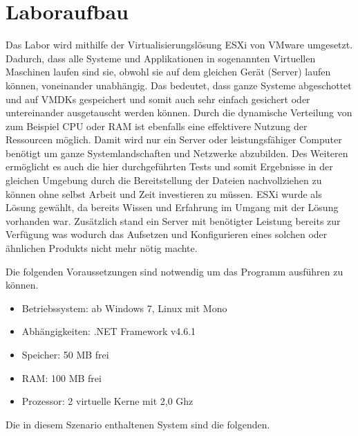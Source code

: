 \section{Laboraufbau}
    Das Labor wird mithilfe der Virtualisierungslösung ESXi %
    von VMware umgesetzt. Dadurch, dass alle Systeme und Applikationen in sogenannten Virtuellen Maschinen laufen sind sie, obwohl sie auf dem gleichen Gerät (Server) laufen können, voneinander unabhängig. Das bedeutet, dass ganze Systeme abgeschottet und auf \ac{VMDK}s gespeichert und somit auch sehr einfach gesichert oder untereinander ausgetauscht werden können. Durch die dynamische Verteilung von zum Beispiel CPU oder RAM ist ebenfalls eine effektivere Nutzung der Ressourcen möglich. Damit wird nur ein Server oder leistungsfähiger Computer benötigt um ganze Systemlandschaften und Netzwerke abzubilden. Des Weiteren ermöglicht es auch die hier durchgeführten Tests und somit Ergebnisse in der gleichen Umgebung durch die Bereitstellung der Dateien nachvollziehen zu können ohne selbst Arbeit und Zeit investieren zu müssen.
    ESXi wurde als Lösung gewählt, da bereits Wissen und Erfahrung im Umgang mit der Lösung vorhanden war. Zusätzlich stand ein Server mit benötigter Leistung bereits zur Verfügung was wodurch das Aufsetzen und Konfigurieren eines solchen oder ähnlichen Produkts nicht mehr nötig machte.
    
    Die folgenden Voraussetzungen sind notwendig um das Programm ausführen zu können.
    \begin{itemize}
        \item Betriebssystem: ab Windows 7, Linux mit Mono
        \item Abhängigkeiten: .NET Framework v4.6.1
        \item Speicher: 50 MB frei
        \item RAM: 100 MB frei
        \item Prozessor: 2 virtuelle Kerne  mit 2,0 Ghz
    \end{itemize}
    
    Die in diesem Szenario enthaltenen System sind die folgenden.
    
